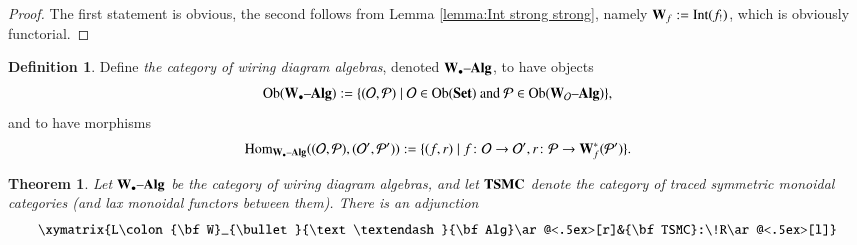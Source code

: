 \documentclass{amsart}
\def\tn{\textnormal}
\def\mc{\mathcal}
\def\Hom{\tn{Hom}}
\def\Ob{\tn{Ob}}
\def\to{\rightarrow}
\def\taking{\colon}
\def\|{{\;|\;}}
\def\Set{{\bf Set}}
\def\alg{{\text \textendash}{\bf Alg}}
\def\mcO{\mc{O}}
\def\mcP{\mc{P}}
\def\bfW{{\bf W}}
\newcommand{\Wir}[1]{\bfW_{#1}}
\def\TSMC{{\bf TSMC}}
\def\Int{\tn{Int}}
\newtheorem{theorem}[subsubsection]{Theorem}
\theoremstyle{remark}
\theoremstyle{definition}
\newtheorem{definition}[subsubsection]{Definition}
\begin{document}
\begin{proof}

The first statement is obvious, the second follows from Lemma \ref{lemma:Int strong strong}, namely $\Wir{f}:=\Int(f_!)$, which is obviously functorial.

\end{proof}

\begin{definition}

Define {\em the category of wiring diagram algebras}, denoted $\Wir{\bullet}\alg$, to have objects 
$$\Ob(\Wir{\bullet}\alg):=\{(\mcO,\mcP)\|\mcO\in\Ob(\Set)\tn{ and } \mcP\in\Ob(\Wir{\mcO}\alg)\},$$
and to have morphisms
$$\Hom_{\Wir{\bullet}\alg}((\mcO,\mcP),(\mcO',\mcP')):=\{(f,r)\|f\taking\mcO\to\mcO', r\taking\mcP\to\Wir{f}^*(\mcP')\}.$$

\end{definition}

\begin{theorem}

Let $\Wir{\bullet}\alg$ be the category of wiring diagram algebras, and let $\TSMC$ denote the category of traced symmetric monoidal categories (and lax monoidal functors between them). There is an adjunction
$$\xymatrix{L\taking\Wir{\bullet}\alg\ar@<.5ex>[r]&\TSMC:\!R\ar@<.5ex>[l]}$$

\end{theorem}
\end{document}
